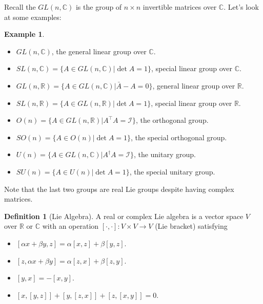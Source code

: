 \documentclass{book}
\theoremstyle{definition}
\newtheorem{defn}{Definition}[section]
\newtheorem{exmp}{Example}[section]
\newcommand{\R}{\mathbb{R}}
\newcommand{\C}{\mathbb{C}}
\newcommand{\al}{\alpha}
\newcommand{\be}{\beta}
\newcommand{\Id}{\mathcal{I}}
\begin{document}
Recall the $GL(n,\C)$ is the group of  $n\times n$ invertible matrices over $\C$. Let's look at some examples:

\begin{exmp}
	$\,$
	\begin{itemize}
		\item $GL(n,\mathbb{C})$, the general linear group over $\mathbb{C}$.
		
		\item $SL(n,\mathbb{C}) = \{ A \in GL(n,\mathbb{C}) \vert \det{A} = 1 \}$, special linear group over $\C$. 
		
		\item $GL(n,\R) = \{ A\in GL(n,\C) \vert \bar{A} - A = 0 \}$, general linear group over $\R$. 
		
		\item $SL(n,\mathbb{R}) = \{ A \in GL(n,\mathbb{R}) \vert \det{A} = 1 \}$, special linear group over $\R$. 
		
		\item $O(n) = \{ A\in GL(n,\R) \vert A^\top A = \Id \}$, the orthogonal group.
		
		\item $SO(n) = \{ A\in O(n) \vert \det{A} = 1 \}$, the special orthogonal group.
		
		\item $U(n) = \{ A\in GL(n,\C) \vert A^\dagger A = \Id\}$, the unitary group.
		
		\item $SU(n) = \{ A \in U(n)\vert  \det{A} = 1   \}$, the special unitary group.  
	\end{itemize}

	Note that the last two groups are real Lie groups despite having complex matrices. 
\end{exmp}




\begin{defn}[Lie Algebra]
	A real or complex Lie algebra is a vector space $V$ over $\R$ or $\C$ with an operation $[\cdot,\cdot]: V\times V \to V$ (Lie bracket) satisfying
	\begin{itemize}
		\item $[\al x + \be y, z] = \al[x,z] + \be[y,z]$.
		\item $[z,\al x + \be y] = \al[z,x] + \be[z,y]$.
		\item $[y,x] = -[x,y]$.
		\item $[x,[y,z]] + [y,[z,x]] + [z,[x,y]] = 0$.
	\end{itemize}
\end{defn}
\end{document}
